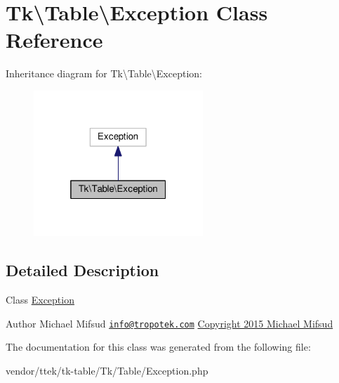 \hypertarget{classTk_1_1Table_1_1Exception}{\section{Tk\textbackslash{}Table\textbackslash{}Exception Class Reference}
\label{classTk_1_1Table_1_1Exception}
}


Inheritance diagram for Tk\textbackslash{}Table\textbackslash{}Exception\+:\nopagebreak
\begin{figure}[H]
\begin{center}
\leavevmode
\includegraphics[width=181pt]{classTk_1_1Table_1_1Exception__inherit__graph}
\end{center}
\end{figure}


\subsection{Detailed Description}
Class \hyperlink{classTk_1_1Table_1_1Exception}{Exception}

\begin{DoxyAuthor}{Author}
Michael Mifsud \href{mailto:info@tropotek.com}{\tt info@tropotek.\+com} \hyperlink{}{Copyright 2015 Michael Mifsud }
\end{DoxyAuthor}


The documentation for this class was generated from the following file\+:\begin{DoxyCompactItemize}
\item 
vendor/ttek/tk-\/table/\+Tk/\+Table/Exception.\+php\end{DoxyCompactItemize}
